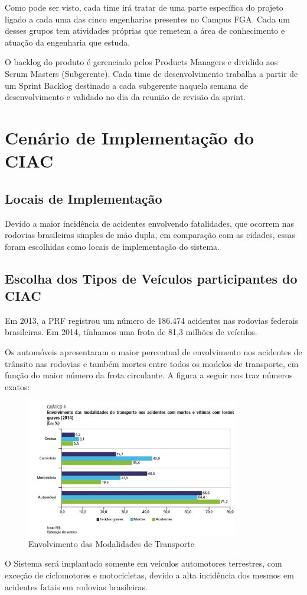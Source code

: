 Como pode ser visto, cada time irá tratar de uma  parte específica do projeto ligado a cada uma das cinco engenharias presentes no Campus FGA. Cada um desses grupos tem atividades próprias que remetem a área de conhecimento e atuação da engenharia que estuda.

O backlog do produto é gerenciado pelos Products Managers e dividido aos Scrum Masters (Subgerente). Cada time de desenvolvimento trabalha a partir de um Sprint Backlog destinado a cada subgerente naquela semana de desenvolvimento e validado no dia da reunião de revisão da sprint.


\section{Cenário de Implementação do CIAC}

\subsection{Locais de Implementação}

Devido a maior incidência de acidentes envolvendo fatalidades, que ocorrem nas rodovias brasileiras simples de mão dupla, em comparação com as cidades, essas foram escolhidas como locais de implementação do sistema.


\subsection{Escolha dos Tipos de Veículos participantes do CIAC}

Em 2013, a PRF registrou um número de 186.474 acidentes nas rodovias federais brasileiras. Em 2014, tínhamos uma frota de 81,3 milhões de veículos.

Os automóveis apresentaram o maior percentual de envolvimento nos acidentes de trânsito nas rodovias e também mortes entre todos os modelos de transporte, em função do maior número da frota circulante. A figura a seguir nos traz números exatos:

\begin{figure}[h]
  \centering
  \includegraphics[width=350px, scale=0.5]{figuras/niveisacidente}
  \caption{Envolvimento das Modalidades de Transporte}
\label{fig:time}
\end{figure}

O Sistema será implantado somente em veículos automotores terrestres, com exceção de ciclomotores e motocicletas, devido a alta incidência dos mesmos em acidentes fatais em rodovias brasileiras.
